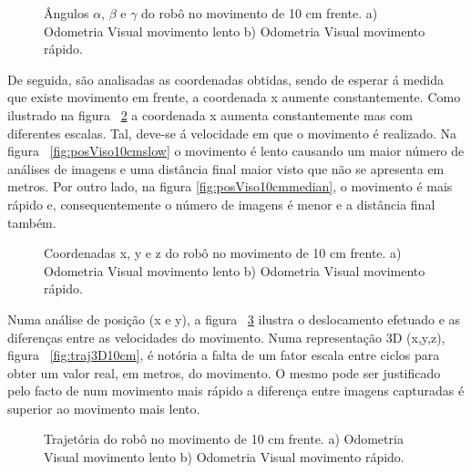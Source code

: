 \begin{figure}[h!]
	\centering
	\qquad
	\caption{Ângulos $\alpha$, $\beta$ e $\gamma$ do robô  no movimento de 10 cm frente. a) Odometria Visual movimento lento b) Odometria Visual movimento rápido.}
	\label{fig:ang10cm}
\end{figure}


De seguida, são analisadas as coordenadas obtidas, sendo de esperar á medida que existe movimento em frente, a coordenada x aumente constantemente. Como ilustrado na figura ~\ref{fig:pos10cm} a coordenada x aumenta constantemente mas com diferentes escalas. Tal, deve-se á velocidade em que o movimento é realizado. Na figura ~\ref{fig:posViso10cmslow} o movimento é lento causando um maior número de análises de imagens e uma distância final maior visto que não se apresenta em metros. Por outro lado, na figura \ref{fig:posViso10cmmedian}, o movimento é mais rápido e, consequentemente o número de imagens é menor e a distância final também.


\begin{figure}[h!]
	\centering
	\qquad
	\caption{Coordenadas x, y e z do robô no movimento de 10 cm frente. a) Odometria Visual movimento lento b) Odometria Visual movimento rápido.}
	\label{fig:pos10cm}
\end{figure}


Numa análise de posição (x e y), a figura ~\ref{fig:traj10cm} ilustra o deslocamento efetuado e as diferenças entre as velocidades do movimento. Numa representação 3D (x,y,z), figura ~\ref{fig:traj3D10cm}, é notória a falta de um fator escala entre ciclos para obter um valor real, em metros, do movimento.  O mesmo pode ser justificado pelo facto de num  movimento mais rápido a diferença entre imagens capturadas é superior ao movimento mais lento. 


\begin{figure}[h!]
	\centering
	\qquad
	\caption{Trajetória do robô no movimento de 10 cm frente. a) Odometria Visual movimento lento b) Odometria Visual movimento rápido.}
	\label{fig:traj10cm}
\end{figure}




